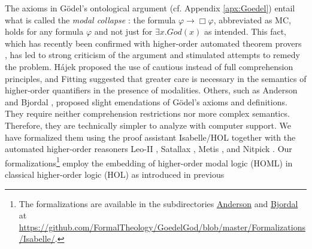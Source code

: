 \documentclass{birkjour}
\theoremstyle{definition}
\theoremstyle{remark}
\numberwithin{equation}{section}
\begin{document}
\maketitle

\vspace*{-5em}

\noindent
The axioms in G\"odel's ontological argument 
\cite{GoedelNotes,ScottNotes} (cf. Appendix \ref{apx:Goedel}) entail what is called the \emph{modal collapse}
\cite{Sobel1987,SobelBook2004}: the formula $\varphi \rightarrow \Box
\varphi$, abbreviated as MC, holds for any formula $\varphi$ and not
just for $\exists x. \mathit{God}(x)$ as intended. This fact, which has
recently been confirmed with higher-order automated theorem provers
\cite{C40,J30}, has led to strong criticism of the argument and stimulated attempts to remedy the problem. Hájek
\cite{Hajek_der_Mathematiker_2002,Hajek_Magari_and_others_1996} proposed the use
of cautious instead of full comprehension principles, and Fitting \cite{fitting02:_types_tableaus_god} suggested that greater care is necessary in the semantics of higher-order quantifiers in the presence of modalities. Others, such as
Anderson
\cite{anderson90:_some_emend_of_goedel_ontol_proof,AndersonGettings}
and Bjordal \cite{bjordal99}, proposed slight emendations of
G\"odel's axioms and definitions. They require neither comprehension restrictions nor more complex semantics. Therefore, they are technically simpler to analyze with computer support. We have formalized them using the proof
assistant Isabelle/HOL \cite{Isabelle} together with the automated higher-order
reasoners Leo-II \cite{C26}, Satallax \cite{brown2012satallax}, Metis
\cite{Hurd03first-orderproof}, and Nitpick \cite{Nitpick}.  
Our formalizations\footnote{The
  formalizations are available in the subdirectories \url{Anderson}
  and \url{Bjordal} at
  \url{https://github.com/FormalTheology/GoedelGod/blob/master/Formalizations/Isabelle/}.}
employ the embedding of higher-order modal logic (HOML) in classical
higher-order logic (HOL) as introduced in previous
\end{document}
